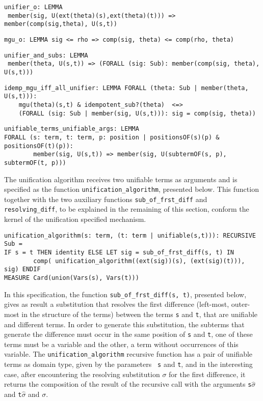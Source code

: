 \documentclass[submission,copyright,creativecommons]{eptcs}
\begin{document}
  {\small
\begin{verbatim}
unifier_o: LEMMA
 member(sig, U(ext(theta)(s),ext(theta)(t))) => member(comp(sig,theta), U(s,t))
\end{verbatim}
  } {\small
\begin{verbatim}
mgu_o: LEMMA sig <= rho => comp(sig, theta) <= comp(rho, theta)
\end{verbatim}
  } {\small
\begin{verbatim}
unifier_and_subs: LEMMA
 member(theta, U(s,t)) => (FORALL (sig: Sub): member(comp(sig, theta), U(s,t)))
\end{verbatim}
  } {\small
\begin{verbatim}
idemp_mgu_iff_all_unifier: LEMMA FORALL (theta: Sub | member(theta, U(s,t))):
    mgu(theta)(s,t) & idempotent_sub?(theta)  <=>
    (FORALL (sig: Sub | member(sig, U(s,t))): sig = comp(sig, theta))
\end{verbatim}
  } {\small
\begin{verbatim}
unifiable_terms_unifiable_args: LEMMA
FORALL (s: term, t: term, p: position | positionsOF(s)(p) & positionsOF(t)(p)):
        member(sig, U(s,t)) => member(sig, U(subtermOF(s, p), subtermOF(t, p)))
\end{verbatim}
  }

  The unification algorithm receives two unifiable terms as arguments
  and is specified as the function {\tt unification\_algorithm},
  presented below. This function together with the two auxiliary
  functions {\tt sub\_of\_frst\_diff} and {\tt resolving\_diff}, to be
  explained in the remaining of this section, conform the kernel of
  the unification specified mechanism.

  {\small
\begin{verbatim}
unification_algorithm(s: term, (t: term | unifiable(s,t))): RECURSIVE Sub = 
IF s = t THEN identity ELSE LET sig = sub_of_frst_diff(s, t) IN
        comp( unification_algorithm((ext(sig))(s), (ext(sig)(t))), sig) ENDIF
MEASURE Card(union(Vars(s), Vars(t)))
\end{verbatim}
  }

  In this specification, the function {\tt sub\_of\_frst\_diff(s, t)},
  presented below, gives as result a substitution that resolves the
  first difference (left-most, outer-most in the structure of the
  terms) between the terms {\tt s} and {\tt t}, that are unifiable and
  different terms. In order to generate this substitution, the
  subterms that generate the difference must occur in the same
  position of {\tt s} and {\tt t}, one of these terms must be a
  variable and the other, a term without occurrences of this
  variable. The {\tt unification\_algorithm} recursive function has a
  pair of unifiable terms as domain type, given by the parameters {\tt
    s} and {\tt t}, and in the interesting case, after encountering
  the resolving substitution $\sigma$ for the first difference, it
  returns the composition of the result of the recursive call with the
  arguments {\tt s$\hat{\sigma}$} and {\tt t$\hat{\sigma}$} and
  $\sigma$.
\end{document}

